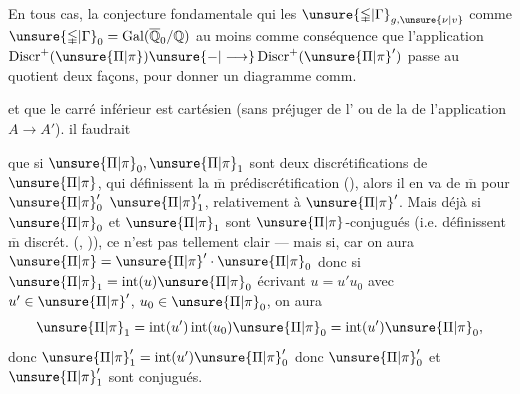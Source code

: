 En tous cas, la conjecture fondamentale qui  les $\unsure{\mathbb{\Gamma}|\Gamma}_{g,\unsure{\nu|v}}$ comme $\unsure{\mathbb{\Gamma}|\Gamma}_0=\operatorname{Gal}(\overline{\mathbb Q}_0/\mathbb Q)$  au moins comme conséquence que l'application $\operatorname{Discr}^{+}(\unsure{\Pi|\pi})\unsure{-|\longrightarrow}\operatorname{Discr}^{+}(\unsure{\Pi|\pi}')$ passe au quotient  deux façons, pour donner un diagramme comm.


et que le  carré inférieur est cartésien (sans préjuger de l' ou de la  de l'application $A\longrightarrow A'$).  il faudrait

que  si $\unsure{\Pi|\pi}_0,\unsure{\Pi|\pi}_1$ sont deux discrétifications  de $\unsure{\Pi|\pi}$, qui définissent la $\overline{\mathrm m}$ prédiscrétification (), alors il en va de $\overline{\mathrm m}$ pour  $\unsure{\Pi|\pi}'_0$  $\unsure{\Pi|\pi}'_1$, relativement à $\unsure{\Pi|\pi}'$. Mais déjà si $\unsure{\Pi|\pi}_0$ et $\unsure{\Pi|\pi}_1$ sont $\unsure{\Pi|\pi}$-conjugués (i.e. définissent $\overline{\mathrm m}$ discrét. (, \uline{})), ce n'est pas tellement clair ---  mais si, car on aura $\unsure{\Pi|\pi}=\unsure{\Pi|\pi}'\cdot\unsure{\Pi|\pi}_0$ donc si $\unsure{\Pi|\pi}_1=\operatorname{int}(u)\unsure{\Pi|\pi}_0$ écrivant $u=u'u_0$ avec $u'\in\unsure{\Pi|\pi}'$, $u_0\in\unsure{\Pi|\pi}_0$, on aura
\[
\unsure{\Pi|\pi}_1=\operatorname{int}(u')\operatorname{int}(u_0)\unsure{\Pi|\pi}_0=\operatorname{int}(u')\unsure{\Pi|\pi}_0,
\]
donc $\unsure{\Pi|\pi}'_1=\operatorname{int}(u')\unsure{\Pi|\pi}'_0$ donc $\unsure{\Pi|\pi}'_0$ et $\unsure{\Pi|\pi}'_1$ sont conjugués.

